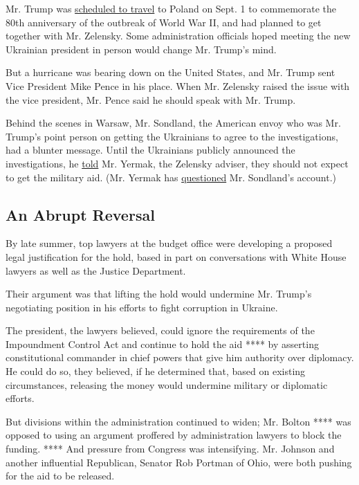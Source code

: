 Mr. Trump was
\href{https://www.militarytimes.com/news/pentagon-congress/2019/07/31/trump-to-visit-poland-for-world-war-ii-anniversary-sept-1/}{scheduled
to travel} to Poland on Sept. 1 to commemorate the 80th anniversary of
the outbreak of World War II, and had planned to get together with Mr.
Zelensky. Some administration officials hoped meeting the new Ukrainian
president in person would change Mr. Trump's mind.

But a hurricane was bearing down on the United States, and Mr. Trump
sent Vice President Mike Pence in his place. When Mr. Zelensky raised
the issue with the vice president, Mr. Pence said he should speak with
Mr. Trump.

Behind the scenes in Warsaw, Mr. Sondland, the American envoy who was
Mr. Trump's point person on getting the Ukrainians to agree to the
investigations, had a blunter message. Until the Ukrainians publicly
announced the investigations, he
\href{https://www.nytimes.com/2019/11/05/us/politics/impeachment-trump.html}{told}
Mr. Yermak, the Zelensky adviser, they should not expect to get the
military aid. (Mr. Yermak has
\href{https://time.com/5746417/ukraine-andriy-yermak-impeachment-interview/}{questioned}
Mr. Sondland's account.)

\hypertarget{an-abrupt-reversal}{%
\subsection{An Abrupt Reversal}\label{an-abrupt-reversal}}

By late summer, top lawyers at the budget office were developing a
proposed legal justification for the hold, based in part on
conversations with White House lawyers as well as the Justice
Department.

Their argument was that lifting the hold would undermine Mr. Trump's
negotiating position in his efforts to fight corruption in Ukraine.

The president, the lawyers believed, could ignore the requirements of
the Impoundment Control Act and continue to hold the aid **** by
asserting constitutional commander in chief powers that give him
authority over diplomacy. He could do so, they believed, if he
determined that, based on existing circumstances, releasing the money
would undermine military or diplomatic efforts.

But divisions within the administration continued to widen; Mr. Bolton
**** was opposed to using an argument proffered by administration
lawyers to block the funding. **** And pressure from Congress was
intensifying. Mr. Johnson and another influential Republican, Senator
Rob Portman of Ohio, were both pushing for the aid to be released.

